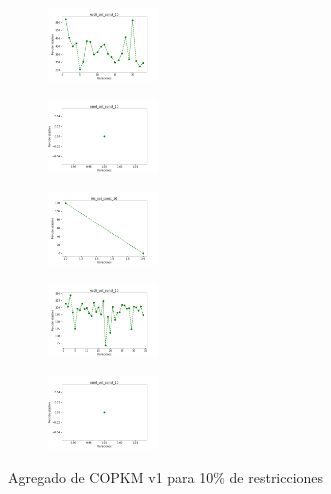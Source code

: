 \begin{figure}[H]
\begin{subfigure}
    \end{subfigure}
    \hfill
    \begin{subfigure}
        \centering
        \includegraphics[width=0.32\textwidth]{img/copkm/ecoli_set_const_10_49258669_cost.png}
    \end{subfigure}
    \hfill
    \begin{subfigure}
        \centering
        \includegraphics[width=0.32\textwidth]{img/copkm/rand_set_const_10_49258669_cost.png}
    \end{subfigure}
    \hfill
    \begin{subfigure}
        \centering
        \includegraphics[width=0.32\textwidth]{img/copkm/iris_set_const_10_3773969821_cost.png}
    \end{subfigure}
    \hfill
    \begin{subfigure}
        \centering
        \includegraphics[width=0.32\textwidth]{img/copkm/ecoli_set_const_10_3773969821_cost.png}
    \end{subfigure}
    \hfill
    \begin{subfigure}
        \centering
        \includegraphics[width=0.32\textwidth]{img/copkm/rand_set_const_10_3773969821_cost.png}
    \end{subfigure}
    \caption{Agregado de COPKM v1 para 10\% de restricciones}
\end{figure}

